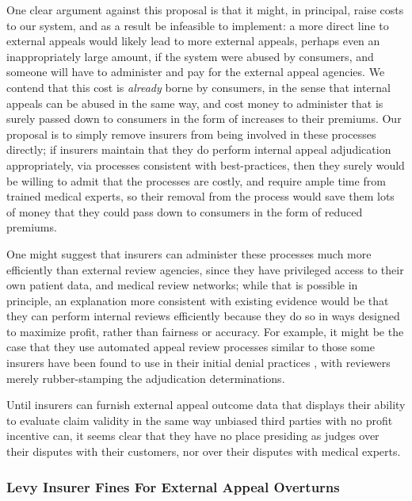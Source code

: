 \documentclass[12pt, a4paper,twoside]{report}
\theoremstyle{plain} %
\theoremstyle{definition} %
\theoremstyle{remark} %
\numberwithin{equation}{chapter}
\begin{document}
		One clear argument against this proposal is that it might, in principal, raise costs to our system, and as a result be infeasible to implement: a more direct line to external appeals would likely lead to more external appeals, perhaps even an inappropriately large amount, if the system were abused by consumers, and someone will have to administer and pay for the external appeal agencies. We contend that this cost is \emph{already} borne by consumers, in the sense that internal appeals can be abused in the same way, and cost money to administer that is surely passed down to consumers in the form of increases to their premiums. Our proposal is to simply remove insurers from being involved in these processes directly; if insurers maintain that they do perform internal appeal adjudication appropriately, via processes consistent with best-practices, then they surely would be willing to admit that the processes are costly, and require ample time from trained medical experts, so their removal from the process would save them lots of money that they could pass down to consumers in the form of reduced premiums.
		
		One might suggest that insurers can administer these processes much more efficiently than external review agencies, since they have privileged access to their own patient data, and medical review networks; while that is possible in principle, an explanation more consistent with existing evidence would be that they can perform internal reviews efficiently because they do so in ways designed to maximize profit, rather than fairness or accuracy. For example, it might be the case that they use automated appeal review processes similar to those some insurers have been found to use in their initial denial practices \cite{armstrong2023a}, with reviewers merely rubber-stamping the adjudication determinations.
		
		Until insurers can furnish external appeal outcome data that displays their ability to evaluate claim validity in the same way unbiased third parties with no profit incentive can, it seems clear that they have no place presiding as judges over their disputes with their customers, nor over their disputes with medical experts. 
		
		\subsubsection{Levy Insurer Fines For External Appeal Overturns}
		
\end{document}

